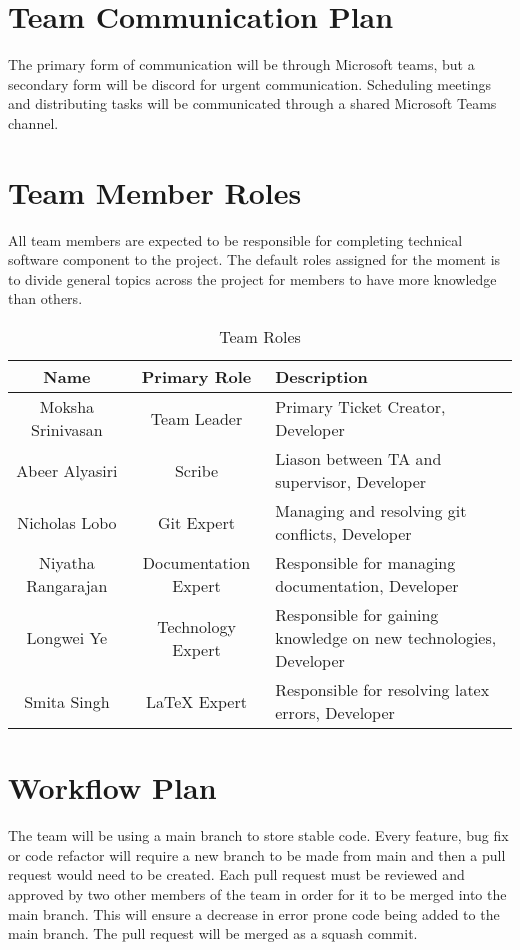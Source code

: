 \documentclass{article}
\begin{document}
\section{Team Communication Plan}
The primary form of communication will be through Microsoft teams, but a secondary form will be discord for urgent communication. Scheduling meetings and distributing tasks will be communicated through a shared Microsoft Teams channel. %

\section{Team Member Roles} 
All team members are expected to be responsible for completing technical software component to the project. The default roles assigned for the moment is to divide general topics across the project for members to have more knowledge than others. 
\begin{table}[H]
    \centering
    \begin{tabular}{|c|c|p{60mm}|}
         \hline
         Name & Primary Role & Description\\
         \hline
         Moksha Srinivasan & Team Leader & Primary Ticket Creator, Developer\\
         \hline
         Abeer Alyasiri & Scribe & Liason between TA and supervisor, Developer\\
         \hline
         Nicholas Lobo & Git Expert & Managing and resolving git conflicts, Developer \\
         \hline
         Niyatha Rangarajan & Documentation Expert & Responsible for managing documentation, Developer \\
         \hline
         Longwei Ye & Technology Expert & Responsible for gaining knowledge on new technologies, Developer  \\
         \hline
         Smita Singh & LaTeX Expert & Responsible for resolving latex errors, Developer \\
         \hline
    \end{tabular}
    \caption{Team Roles}
    \label{tab:team_roles}
\end{table}

\section{Workflow Plan} %

The team will be using a main branch to store stable code. Every feature, bug fix or code refactor will require a new branch to be made from main and then a pull request would need to be created. Each pull request must be reviewed and approved by two other members of the team in order for it to be merged into the main branch. This will ensure a decrease in error prone code being added to the main branch. The pull request will be merged as a squash commit.
\end{document}
